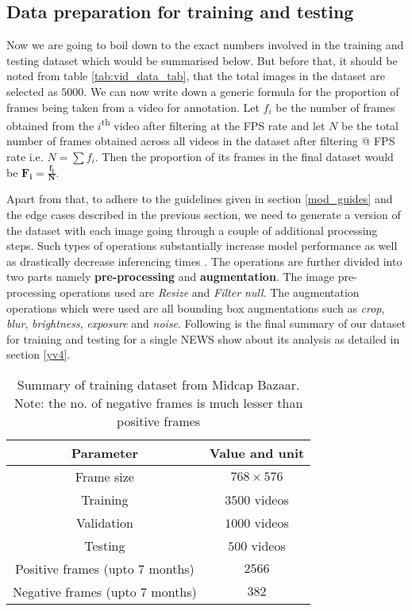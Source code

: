 \subsection{Data preparation for training and testing} \label{train_test}
Now we are going to boil down to the exact numbers involved in the training and testing dataset which would be summarised below. But before that, it should be noted from table \ref{tab:vid_data_tab}, that the total images in the dataset are selected as $5000$. We can now write down a generic formula for the proportion of frames being taken from a video for annotation. Let $f_i$ be the number of frames obtained from the $i$\textsuperscript{th} video after filtering at the FPS rate and let $N$ be the total number of frames obtained across all videos in the dataset after filtering @ FPS rate i.e. $N = \sum f_{i}$. Then the proportion of its frames in the final dataset would be $\boldsymbol{F_{i} = \frac{f_{i}}{N}}$. \par

Apart from that, to adhere to the guidelines given in section \ref{mod_guides} and the edge cases described in the previous section, we need to generate a version of the dataset with each image going through a couple of additional processing steps. Such types of operations substantially increase model performance as well as drastically decrease inferencing times \cite{Joseph2021} \cite{Dwyer2020}. The operations are further divided into two parts namely \textbf{pre-processing} and \textbf{augmentation}.  The image pre-processing operations used are \textit{Resize} and \textit{Filter null}. The augmentation operations which were used are all bounding box augmentations such as \textit{crop}, \textit{blur}, \textit{brightness}, \textit{exposure} and \textit{noise}. Following is the final summary of our dataset for training and testing for a single NEWS show about its analysis as detailed in section \ref{yv4}.

\begin{table}[h]
  \def\arraystretch{1.5}
  \centering
  \caption{Summary of training dataset from Midcap Bazaar. Note: the no. of negative frames is much lesser than positive frames}
  \begin{tabular}{|c|c|}
    \hline
    Parameter                         & Value and unit   \\
    \hline
    Frame size                        & $768 \times 576$ \\
    \hline
    Training                          & $3500$ videos    \\
    \hline
    Validation                        & $1000$ videos    \\
    \hline
    Testing                           & $500$ videos     \\
    \hline
    Positive frames (upto $7$ months) & $2566$           \\
    \hline
    Negative frames (upto $7$ months) & $382$            \\
    \hline
  \end{tabular}
  \label{tab:vid_train}
\end{table}

